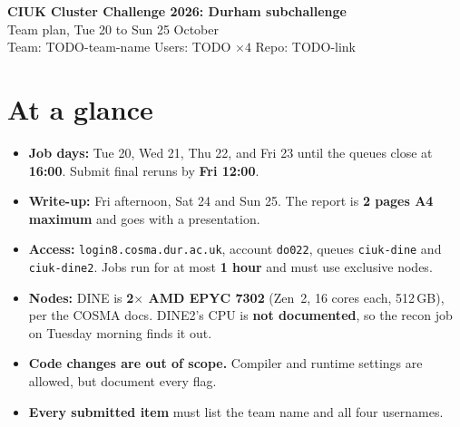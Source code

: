\documentclass[10pt,a4paper]{article}
\newcommand{\deadline}[1]{\textbf{\color{red!70!black}#1}}
\begin{document}
{\LARGE\bfseries CIUK Cluster Challenge 2026: Durham subchallenge}\\[2pt]
{\large Team plan, Tue 20 to Sun 25 October}\\[2pt]
{\small\color{ink2}Team: TODO-team-name \quad Users: TODO $\times 4$ \quad Repo: TODO-link}

\section*{At a glance}
\begin{itemize}
  \item \textbf{Job days:} Tue 20, Wed 21, Thu 22, and Fri 23 until the queues close at \deadline{16:00}. Submit final reruns by \deadline{Fri 12:00}.
  \item \textbf{Write-up:} Fri afternoon, Sat 24 and Sun 25. The report is \deadline{2 pages A4 maximum} and goes with a presentation.
  \item \textbf{Access:} \texttt{login8.cosma.dur.ac.uk}, account \texttt{do022}, queues \texttt{ciuk-dine} and \texttt{ciuk-dine2}. Jobs run for at most \textbf{1 hour} and must use exclusive nodes.
  \item \textbf{Nodes:} DINE is \textbf{2$\times$ AMD EPYC 7302} (Zen~2, 16 cores each, 512\,GB), per the COSMA docs. DINE2's CPU is \textbf{not documented}, so the recon job on Tuesday morning finds it out.
  \item \textbf{Code changes are out of scope.} Compiler and runtime settings are allowed, but document every flag.
  \item \textbf{Every submitted item} must list the team name and all four usernames.
\end{itemize}
\end{document}
